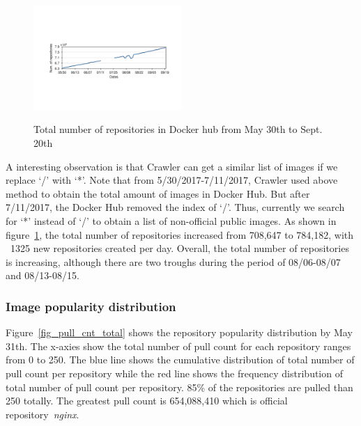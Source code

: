 \begin{figure}
  \centering
  \includegraphics[width=0.5\textwidth]{graphs/image_growth}\\
  \caption{Total number of repositories in Docker hub from May 30th to Sept. 20th}\label{fig_image_growth}
\end{figure}


A interesting observation is that Crawler can get a similar list of images if we replace `/' with `*'. Note that from 5/30/2017-7/11/2017, Crawler used above method to obtain the total amount of images in Docker Hub. But after 7/11/2017, the Docker Hub removed the index of `/'. Thus, currently we search for `*' instead of `/' to obtain a list of non-official public images. As shown in figure~\ref{fig_image_growth}, the total number of repositories increased from 708,647 to 784,182, with ~1325 new repositories created per day. Overall, the total number of repositories is increasing, although there are two troughs during the period of 08/06-08/07 and 08/13-08/15.

\subsubsection{Image popularity distribution}


Figure~\ref{fig_pull_cnt_total} shows the repository popularity distribution by May 31th. The x-axies show the total number of pull count for each repository ranges from 0 to 250. The blue line shows the cumulative distribution of total number of pull count per repository while the red line shows the frequency distribution of total number of pull count per repository. 85\% of the repositories are pulled than 250 totally. The greatest pull count is 654,088,410 which is official repository~\textit{nginx}. 

